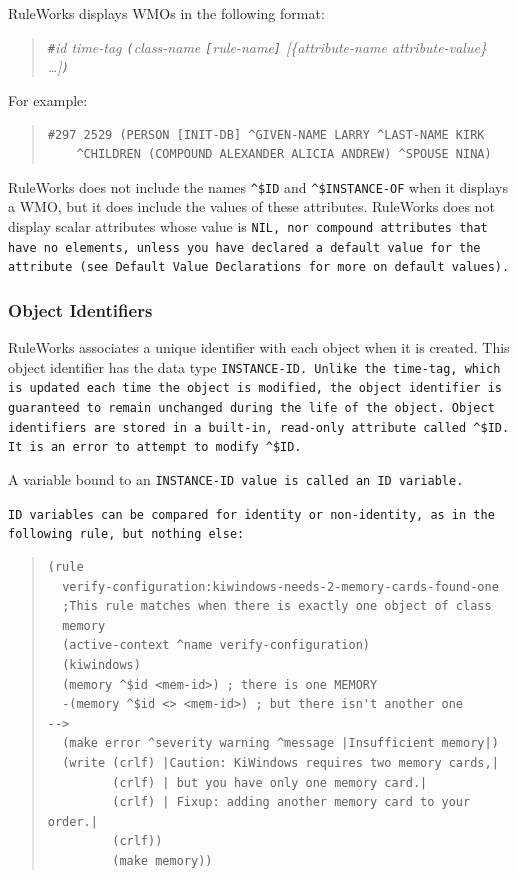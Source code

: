 RuleWorks displays WMOs in the following format:

\begin{quote}
  \verb|#|\it{id} \it{time-tag} \verb|(|\it{class-name}
  \verb|[|\it{rule-name}\verb|]| [\{\ct\it{attribute-name}
  \it{attribute-value}\} \ldots]\verb|)|
\end{quote}

For example:

\begin{quote}
\begin{verbatim}
#297 2529 (PERSON [INIT-DB] ^GIVEN-NAME LARRY ^LAST-NAME KIRK
    ^CHILDREN (COMPOUND ALEXANDER ALICIA ANDREW) ^SPOUSE NINA)
\end{verbatim}
\end{quote}

RuleWorks does not include the names \verb|^$ID| and \verb|^$INSTANCE-OF|
when it displays a WMO, but it does include the values of
these attributes. RuleWorks does not display scalar
attributes whose value is \tt{NIL}, nor compound attributes that
have no elements, unless you have declared a default value
for the attribute (see Default Value Declarations for more on
default values).

\subsubsection*{Object Identifiers}

RuleWorks associates a unique identifier with each object
when it is created. This object identifier has the data type
\tt{INSTANCE-ID}. Unlike the time-tag, which is updated each time
the object is modified, the object identifier is guaranteed
to remain unchanged during the life of the object. Object
identifiers are stored in a built-in, read-only attribute
called \verb|^$ID|. It is an error to attempt to modify \verb|^$ID|.

A variable bound to an \tt{INSTANCE-ID} value is called an \tt{ID}
variable.

\tt{ID} variables can be compared for identity or non-identity,
as in the following rule, but nothing else:

\begin{quote}
\begin{verbatim}
(rule
  verify-configuration:kiwindows-needs-2-memory-cards-found-one
  ;This rule matches when there is exactly one object of class
  memory
  (active-context ^name verify-configuration)
  (kiwindows)
  (memory ^$id <mem-id>) ; there is one MEMORY
  -(memory ^$id <> <mem-id>) ; but there isn't another one
-->
  (make error ^severity warning ^message |Insufficient memory|)
  (write (crlf) |Caution: KiWindows requires two memory cards,|
         (crlf) | but you have only one memory card.|
         (crlf) | Fixup: adding another memory card to your order.|
         (crlf))
         (make memory))
\end{verbatim}
\end{quote}

